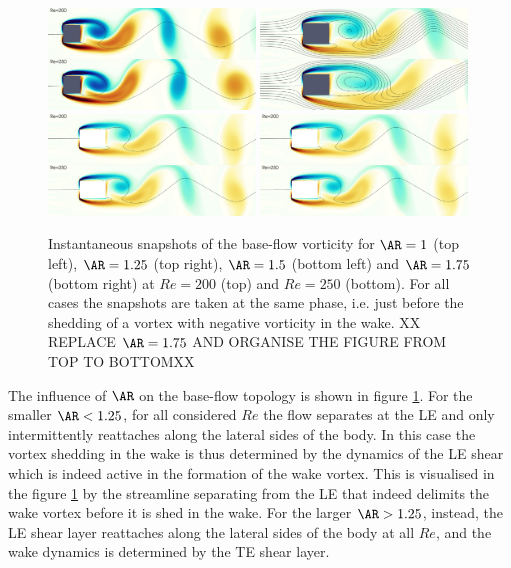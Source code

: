 \begin{figure}
  \centering
  \includegraphics[width=0.49\textwidth]{./fig/AR1/snap/snap.0030.png}
  \includegraphics[width=0.49\textwidth]{./fig/AR1p25/snap/snap.0030.png}
  \includegraphics[width=0.49\textwidth]{./fig/AR1p5/snap/snap.0030.png}
  \includegraphics[width=0.49\textwidth]{./fig/AR1p5/snap/snap.0030.png}  
  \caption{Instantaneous snapshots of the base-flow vorticity for $\AR=1$ (top left), $\AR=1.25$ (top right), $\AR=1.5$ (bottom left) and $\AR=1.75$ (bottom right) at $Re=200$ (top) and $Re=250$ (bottom). For all cases the snapshots are taken at the same phase, i.e. just before the shedding of a vortex with negative vorticity in the wake. XX REPLACE $\AR=1.75$ AND ORGANISE THE FIGURE FROM TOP TO BOTTOMXX}
  \label{fig:bf-short}
\end{figure}
%
The influence of $\AR$ on the base-flow topology is shown in figure \ref{fig:bf-short}. For the smaller $\AR < 1.25$, for all considered $Re$ the flow separates at the LE and only intermittently reattaches along the lateral sides of the body. In this case the vortex shedding in the wake is thus determined by the dynamics of the LE shear which is indeed active in the formation of the wake vortex. This is visualised in the figure \ref{fig:bf-short} by the streamline separating from the LE that indeed delimits the wake vortex before it is shed in the wake. For the larger $\AR>1.25$, instead, the LE shear layer reattaches along the lateral sides of the body at all $Re$, and the wake dynamics is determined by the TE shear layer.
